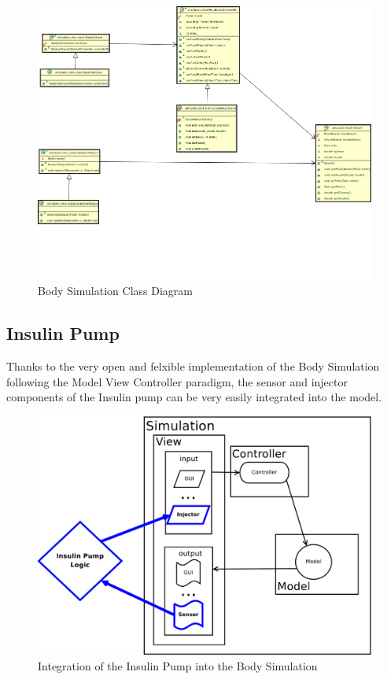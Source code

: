 \begin{landscape}
\begin{figure}[htb]
\centering
\includegraphics[width=\textwidth]{images/body_simulation_classdiagram.png}
\caption{Body Simulation Class Diagram}
\label{fig:body_simulation_class_diagram}
\end{figure}
\end{landscape}

\newpage
\subsection{Insulin Pump}
Thanks to the very open and felxible implementation of the Body Simulation
following the Model View Controller paradigm, the sensor and injector components
of the Insulin pump can be very easily integrated into the model.

\begin{figure}[htb]
\centering
\includegraphics[scale=0.4]{images/mvc_insulin_pump}
\caption{Integration of the Insulin Pump into the Body Simulation}
\label{fig:mvc_insulin_pump}
\end{figure}
